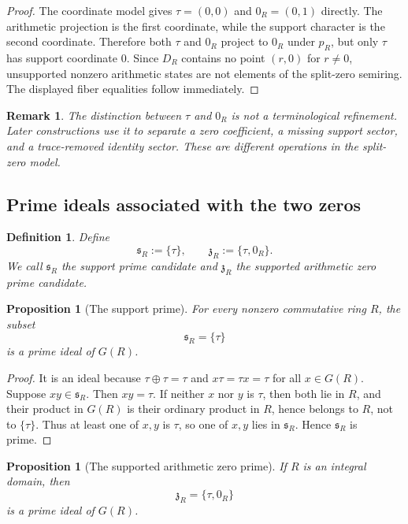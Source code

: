 \documentclass[11pt]{amsart}
\newtheorem{proposition}[theorem]{Proposition}
\newtheorem{definition}[theorem]{Definition}
\newtheorem{remark}[theorem]{Remark}
\newcommand{\tauz}{\tau}
\begin{document}
\begin{proof}
The coordinate model gives $\tauz=(0,0)$ and $0_R=(0,1)$ directly.  The arithmetic projection is the first coordinate, while the support character is the second coordinate.  Therefore both $\tauz$ and $0_R$ project to $0_R$ under $p_R$, but only $\tauz$ has support coordinate $0$.  Since $D_R$ contains no point $(r,0)$ for $r\ne0$, unsupported nonzero arithmetic states are not elements of the split-zero semiring.  The displayed fiber equalities follow immediately.\end{proof}

\begin{remark}
The distinction between $\tauz$ and $0_R$ is not a terminological refinement.  Later constructions use it to separate a zero coefficient, a missing support sector, and a trace-removed identity sector.  These are different operations in the split-zero model.
\end{remark}

\subsection{Prime ideals associated with the two zeros}

\begin{definition}
Define
\[
      \mathfrak s_R:=\{\tauz\},
      \qquad
      \mathfrak z_R:=\{\tauz,0_R\}.
\]
We call $\mathfrak s_R$ the support prime candidate and $\mathfrak z_R$ the supported arithmetic zero prime candidate.
\end{definition}

\begin{proposition}[The support prime]
For every nonzero commutative ring $R$, the subset
\[
       \mathfrak s_R=\{\tauz\}
\]
is a prime ideal of $G(R)$.
\end{proposition}

\begin{proof}
It is an ideal because $\tauz\oplus\tauz=\tauz$ and $x\tauz=\tauz x=\tauz$ for all $x\in G(R)$.  Suppose $xy\in\mathfrak s_R$.  Then $xy=\tauz$.  If neither $x$ nor $y$ is $\tauz$, then both lie in $R$, and their product in $G(R)$ is their ordinary product in $R$, hence belongs to $R$, not to $\{\tauz\}$.  Thus at least one of $x,y$ is $\tauz$, so one of $x,y$ lies in $\mathfrak s_R$.  Hence $\mathfrak s_R$ is prime.\end{proof}

\begin{proposition}[The supported arithmetic zero prime]
If $R$ is an integral domain, then
\[
       \mathfrak z_R=\{\tauz,0_R\}
\]
is a prime ideal of $G(R)$.
\end{proposition}
\end{document}

